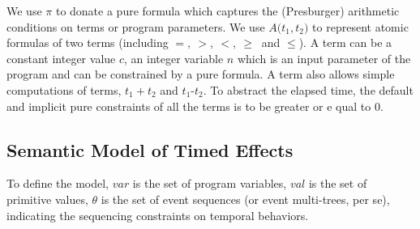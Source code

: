\documentclass[acmsmall,10pt,review]{acmart}
\newcommand{\es}{\theta}
\newcommand{\code}[1]{{\tt{\ensuremath{\m{#1}}}}}
\newcommand{\m}{\mathit}
\begin{document}
{We use \code{{\pi}} to donate a pure formula which captures the (Presburger) arithmetic conditions on terms or program parameters. 
We use \code{{A(}{t_1, t_2}{)}} to represent atomic formulas of two terms (including $  {=},
   \ {>},
   \ {<},
   \ {\geq}\ $ and $ {\leq} $).
A term can be a constant integer value \code{c}, an integer variable \code{n} which is an input parameter of the program and can be constrained by a pure formula. 
A term also allows simple computations of terms, \code{t_1{+}t_2} and \code{t_1\text{-}t_2}. To abstract the elapsed time, the default and implicit pure constraints of all the terms is to be greater or e
qual to  0. 


\subsection{Semantic Model of Timed Effects}
\label{subsec:Specification_Semantics}

To define the model, 
\code{var} is the set of program variables, 
\code{val} is the set of primitive values, 
\code{\es} is the set of event sequences (or event multi-trees, per se), 
indicating the sequencing constraints on temporal behaviors.

}
\end{document}
